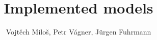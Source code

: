 \documentclass{article}
\numberwithin{equation}{section}
\begin{document}
\author{Vojtěch Miloš, Petr Vágner, Jürgen Fuhrmann}
\title{Implemented models}
\maketitle

%
\end{document}
